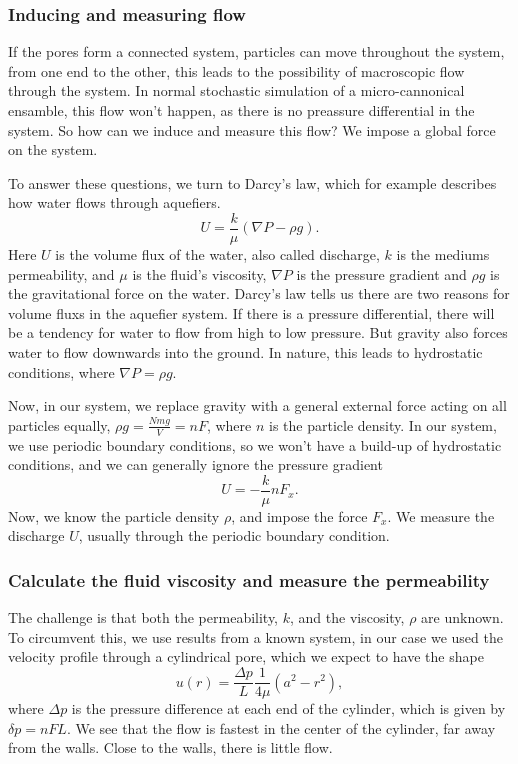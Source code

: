 \documentclass[a4paper, 11pt, notitlepage, english]{article}
\begin{document}
\subsubsection*{Inducing and measuring flow}

If the pores form a connected system, particles can move throughout the system, from one end to the other, this leads to the possibility of macroscopic flow through the system. In normal stochastic simulation of a micro-cannonical ensamble, this flow won't happen, as there is no preassure differential in the system. So how can we induce and measure this flow? We impose a global force on the system.

To answer these questions, we turn to Darcy's law, which for example describes how water flows through aquefiers.
$$U = \frac{k}{\mu}(\nabla P - \rho g).$$
Here $U$ is the volume flux of the water, also called discharge, $k$ is the mediums permeability, and $\mu$ is the fluid's viscosity, $\nabla P$ is the pressure gradient and $\rho g$ is the gravitational force on the water. Darcy's law tells us there are two reasons for volume fluxs in the aquefier system. If there is a pressure differential, there will be a tendency for water to flow from high to low pressure. But gravity also forces water to flow downwards into the ground. In nature, this leads to hydrostatic conditions, where $\nabla P = \rho g$.

Now, in our system, we replace gravity with a general external force acting on all particles equally, $\rho g = \frac{N mg}{V} = n F$, where $n$ is the particle density. In our system, we use periodic boundary conditions, so we won't have a build-up of hydrostatic conditions, and we can generally ignore the pressure gradient
$$U = -\frac{k}{\mu}n F_x.$$
Now, we know the particle density $\rho$, and impose the force $F_x$. We measure the discharge $U$, usually through the periodic boundary condition.

\subsubsection*{Calculate the fluid viscosity and measure the permeability}

The challenge is that both the permeability, $k$, and the viscosity, $\rho$ are unknown. To circumvent this, we use results from a known system, in our case we used the velocity profile through a cylindrical pore, which we expect to have the shape
$$u(r) = \frac{\Delta p}{L} \frac{1}{4\mu}(a^2 - r^2),$$
where $\Delta p$ is the pressure difference at each end of the cylinder, which is given by $\delta p = nFL$. We see that the flow is fastest in the center of the cylinder, far away from the walls. Close to the walls, there is little flow. 
\end{document}
